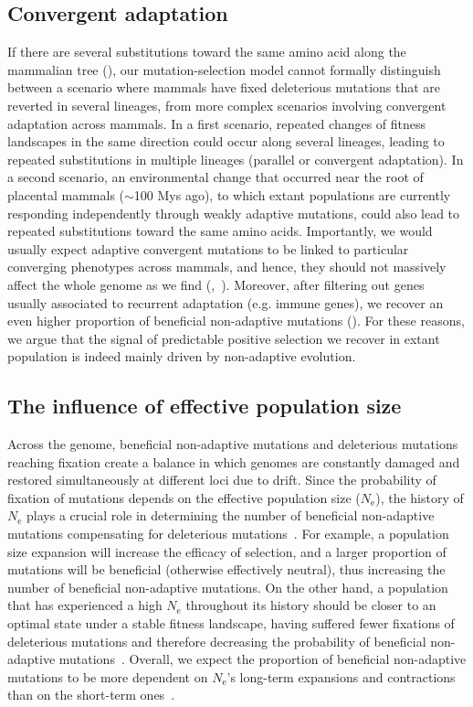 \documentclass[10pt,letterpaper]{article}
\newcommand{\Ne}{N_{\text{e}}}
\begin{document}
\subsection*{Convergent adaptation}

If there are several substitutions toward the same amino acid along the mammalian tree (), our mutation-selection model cannot formally distinguish between a scenario where mammals have fixed deleterious mutations that are reverted in several lineages, from more complex scenarios involving convergent adaptation across mammals.
In a first scenario, repeated changes of fitness landscapes in the same direction could occur along several lineages, leading to repeated substitutions in multiple lineages (parallel or convergent adaptation).
In a second scenario, an environmental change that occurred near the root of placental mammals ($\sim$100 Mys ago), to which extant populations are currently responding independently through weakly adaptive mutations, could also lead to repeated substitutions toward the same amino acids.
Importantly, we would usually expect adaptive convergent mutations to be linked to particular converging phenotypes across mammals, and hence, they should not massively affect the whole genome as we find (,~).
Moreover, after filtering out genes usually associated to recurrent adaptation (e.g. immune genes), we recover an even higher proportion of beneficial non-adaptive mutations ().
For these reasons, we argue that the signal of predictable positive selection we recover in extant population is indeed mainly driven by non-adaptive evolution.

\subsection*{The influence of effective population size}

Across the genome, beneficial non-adaptive mutations and deleterious mutations reaching fixation create a balance in which genomes are constantly damaged and restored simultaneously at different loci due to drift.
Since the probability of fixation of mutations depends on the effective population size ($\Ne$), the history of $\Ne$ plays a crucial role in determining the number of beneficial non-adaptive mutations compensating for deleterious mutations~\cite{latrille_inferring_2021}.
For example, a population size expansion will increase the efficacy of selection, and a larger proportion of mutations will be beneficial (otherwise effectively neutral), thus increasing the number of beneficial non-adaptive mutations.
On the other hand, a population that has experienced a high $\Ne$ throughout its history should be closer to an optimal state under a stable fitness landscape, having suffered fewer fixations of deleterious mutations and therefore decreasing the probability of beneficial non-adaptive mutations~\cite{huber_determining_2017}.
Overall, we expect the proportion of beneficial non-adaptive mutations to be more dependent on $\Ne$’s long-term expansions and contractions than on the short-term ones~\cite{charlesworth_other_2007,huber_determining_2017}.
\end{document}
